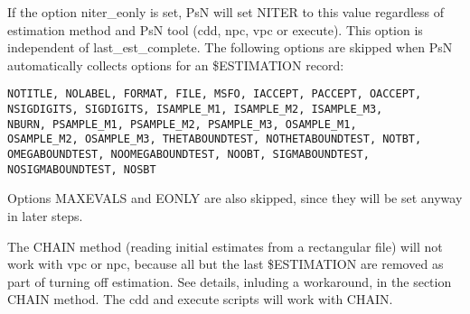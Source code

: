If the option niter\_eonly is set, PsN will set NITER to this value regardless of estimation method and PsN tool (cdd, npc, vpc or execute). This option is independent of last\_est\_complete.
The following options are skipped when PsN automatically collects options for an \$ESTIMATION record:
\begin{verbatim}
NOTITLE, NOLABEL, FORMAT, FILE, MSFO, IACCEPT, PACCEPT, OACCEPT,
NSIGDIGITS, SIGDIGITS, ISAMPLE_M1, ISAMPLE_M2, ISAMPLE_M3,
NBURN, PSAMPLE_M1, PSAMPLE_M2, PSAMPLE_M3, OSAMPLE_M1,
OSAMPLE_M2, OSAMPLE_M3, THETABOUNDTEST, NOTHETABOUNDTEST, NOTBT,
OMEGABOUNDTEST, NOOMEGABOUNDTEST, NOOBT, SIGMABOUNDTEST,
NOSIGMABOUNDTEST, NOSBT
\end{verbatim}
Options MAXEVALS and EONLY are also skipped, since they will be set anyway in later steps.

The CHAIN method (reading initial estimates from a rectangular file) will not work with vpc or npc, because all but the last \$ESTIMATION are removed as part of turning off estimation. See details, inluding a workaround, in the section CHAIN method. The cdd and execute scripts will work with CHAIN.




